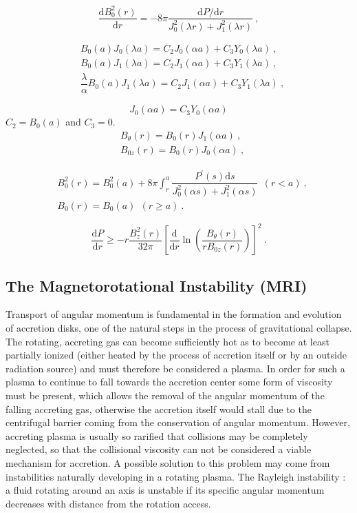 \documentclass[12pt,a4paper]{article}
\newcommand{\dif}{\mathrm{d}}
\begin{document}
\begin{equation}
\dfrac{\dif B^2_0(r) }{\dif r} = -8\pi \dfrac{\dif P/\dif r}{J_0^2(\lambda r) +J_1^2(\lambda r)} ~,
\end{equation}

\begin{align*}
& B_0(a) J_0(\lambda a) = C_2 J_0(\alpha a) +C_3 Y_0(\lambda a) ~, \\
& B_0(a) J_1(\lambda a) = C_2 J_1(\alpha a) +C_3 Y_1(\lambda a) ~, \\
& \dfrac{\lambda}{\alpha} B_0(a) J_1(\lambda a) = C_2 J_1(\alpha a) +C_3 Y_1(\lambda a) ~, 
\end{align*}

\begin{equation*}
[B_0(a) -C_2] J_0(\alpha a) = C_3 Y_0(\alpha a)
\end{equation*}
$C_2 = B_0(a)$ and $C_3 = 0$.
\begin{align}
& B_{\theta}(r) = B_0(r) J_1(\alpha a) ~, \\
& B_{0z}(r) = B_0(r) J_0(\alpha a) ~,
\end{align}

\begin{align}
& B_0^2(r) = B_0^2(a) +8\pi \int_r^a \dfrac{P^\prime(s) \dif s}{J_0^2(\alpha s) +J_1^2(\alpha s)} ~~ (r < a) ~, \\
& B_0(r) =B_0(a)  ~~ (r\geqslant a) ~.
\end{align}

\begin{equation}
\dfrac{\dif P}{\dif r} \geqslant -r \dfrac{B^2_z(r)}{32\pi} \left[\dfrac{\dif }{\dif r} \ln\left(\dfrac{B_\theta(r)}{rB_{0z}(r)}  \right) \right]^2  ~.
\end{equation}




\subsection{The Magnetorotational Instability (MRI)}
Transport of angular momentum is fundamental in the formation and evolution of accretion disks, one of the natural steps in the process of gravitational collapse. The rotating, accreting gas can become sufficiently hot as to become at least partially ionized (either heated by the process of accretion itself or by an outside radiation source) and must therefore be considered a plasma. In order for such a plasma to continue to fall towards the accretion center some form of viscosity must be present, which allows the removal of the angular momentum of the falling accreting gas, otherwise the accretion itself would stall due to the centrifugal barrier coming from the conservation of angular momentum. However, accreting plasma is usually so rarified that collisions may be completely neglected, so that the collisional viscosity can not be considered a viable mechanism for accretion. A possible solution to this problem may come from instabilities naturally developing in a rotating plasma. The Rayleigh instability : a fluid rotating around an axis is unstable if its specific angular momentum decreases with distance from the rotation access. 
\end{document}
